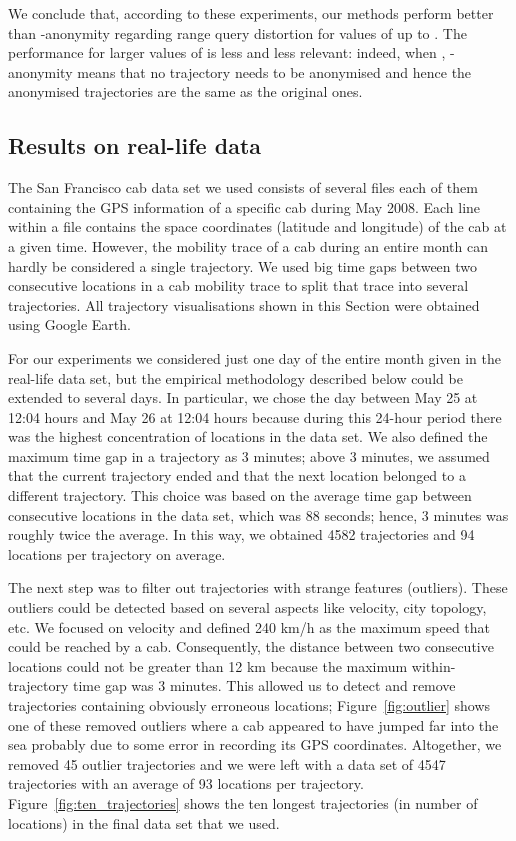 We conclude that, according to these experiments,
our methods perform better than -anonymity
regarding range query distortion for values of  up to .
The performance for larger values of  is less
and less relevant: indeed,
when , -anonymity means
that no trajectory needs to be anonymised and hence the anonymised
trajectories are the same as the original ones.


\subsection{Results on real-life data}



The San Francisco cab data set \cite{comsnets09piorkowski}
we used consists of several files each of them
containing the GPS information of a specific cab during May 2008.
Each line within a file contains the space coordinates (latitude and longitude)
of the cab at a given time. However,
the mobility trace of a cab during an entire month can hardly be
considered a single trajectory.
We used big time gaps between two consecutive locations
in a cab mobility trace to split that trace into several
trajectories. All trajectory visualisations shown in this Section
were obtained using Google Earth.

For our experiments we considered just one
day of the entire month given in the real-life data set, but
the empirical methodology described below could be extended to several days.
In particular, we chose the day between May 25 at 12:04 hours
and May 26 at 12:04 hours because during this 24-hour period
there was the highest
concentration of locations in the data set. We also defined
the maximum time gap in a trajectory as 3 minutes; above 3 minutes,
we assumed that the current trajectory ended and that the next location
belonged to a different trajectory. This choice was based on
the average time gap between consecutive locations in the data set,
which was 88 seconds; hence, 3 minutes was roughly twice the average.
In this way, we obtained 4582 trajectories and 94 locations
per trajectory on average.

The next step was to filter out trajectories with strange features
(outliers). These outliers could be detected
based on several aspects like velocity, city topology, etc.
We focused on velocity and defined 240 km/h as the maximum speed that could
be reached by a cab. Consequently, the distance between
two consecutive locations could not be greater than 12 km because the maximum
within-trajectory time gap was 3 minutes. This allowed us to
detect and remove trajectories containing obviously erroneous locations;
Figure~\ref{fig:outlier} shows one of
these removed outliers where a cab appeared to have
jumped far into the sea probably due
to some error in recording its GPS coordinates.
Altogether, we removed 45 outlier trajectories and we were left
with a data set of 4547 trajectories with an average of
93 locations per trajectory.
Figure~\ref{fig:ten_trajectories} shows the ten longest
trajectories (in number of locations) in the final data set that we used.


